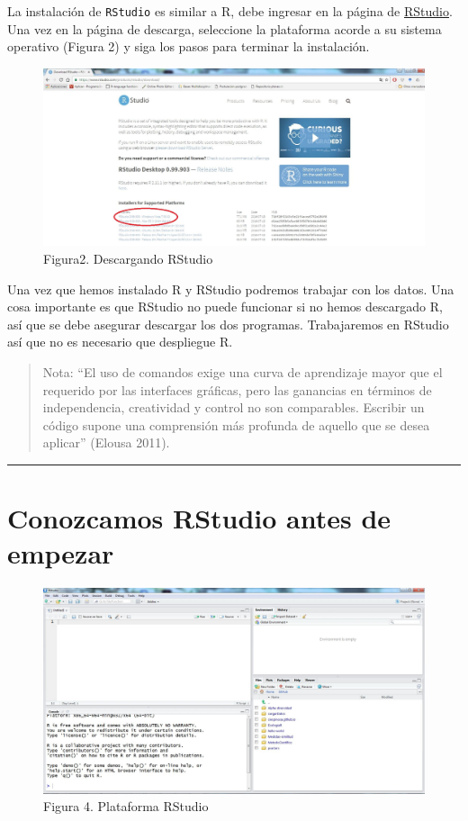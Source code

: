\documentclass[]{article}
\begin{document}
La instalación de \texttt{RStudio} es similar a R, debe ingresar en la
página de
\href{https://www.rstudio.com/products/rstudio/download/}{RStudio}. Una
vez en la página de descarga, seleccione la plataforma acorde a su
sistema operativo (Figura 2) y siga los pasos para terminar la
instalación.

\begin{figure}[htbp]
\centering
\includegraphics{imagen/descargarRStudio.jpg}
\caption{Figura2. Descargando RStudio}
\end{figure}

Una vez que hemos instalado R y RStudio podremos trabajar con los datos.
Una cosa importante es que RStudio no puede funcionar si no hemos
descargado R, así que se debe asegurar descargar los dos programas.
Trabajaremos en RStudio así que no es necesario que despliegue R.

\begin{quote}
Nota: ``El uso de comandos exige una curva de aprendizaje mayor que el
requerido por las interfaces gráficas, pero las ganancias en términos de
independencia, creatividad y control no son comparables. Escribir un
código supone una comprensión más profunda de aquello que se desea
aplicar'' (Elousa 2011).
\end{quote}

\begin{center}\rule{0.5\linewidth}{\linethickness}\end{center}

\section{Conozcamos RStudio antes de
empezar}\label{conozcamos-rstudio-antes-de-empezar}

\begin{figure}[htbp]
\centering
\includegraphics{imagen/RStudio.jpg}
\caption{Figura 4. Plataforma RStudio}
\end{figure}
\end{document}

